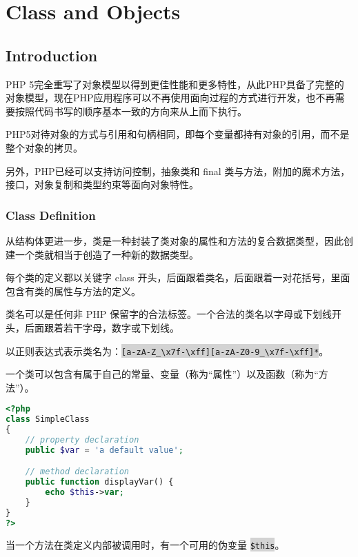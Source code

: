 \part{Class and Objects}







\chapter{Introduction}


PHP 5完全重写了对象模型以得到更佳性能和更多特性，从此PHP具备了完整的对象模型，现在PHP应用程序可以不再使用面向过程的方式进行开发，也不再需要按照代码书写的顺序基本一致的方向来从上而下执行。

PHP5对待对象的方式与引用和句柄相同，即每个变量都持有对象的引用，而不是整个对象的拷贝。

另外，PHP已经可以支持访问控制，抽象类和 final 类与方法，附加的魔术方法，接口，对象复制和类型约束等面向对象特性。



\section{Class Definition}

从结构体更进一步，类是一种封装了类对象的属性和方法的复合数据类型，因此创建一个类就相当于创造了一种新的数据类型。


每个类的定义都以关键字 class 开头，后面跟着类名，后面跟着一对花括号，里面包含有类的属性与方法的定义。

类名可以是任何非 PHP 保留字的合法标签。一个合法的类名以字母或下划线开头，后面跟着若干字母，数字或下划线。

以正则表达式表示类名为：\colorbox{lightgray}{\texttt{[a-zA-Z\_\textbackslash x7f-\textbackslash xff][a-zA-Z0-9\_\textbackslash x7f-\textbackslash xff]*}}。

一个类可以包含有属于自己的常量、变量（称为“属性”）以及函数（称为“方法”）。

\begin{lstlisting}[language=PHP]
<?php
class SimpleClass
{
    // property declaration
    public $var = 'a default value';

    // method declaration
    public function displayVar() {
        echo $this->var;
    }
}
?>
\end{lstlisting}

当一个方法在类定义内部被调用时，有一个可用的伪变量 \colorbox{lightgray}{\texttt{\$this}}。

